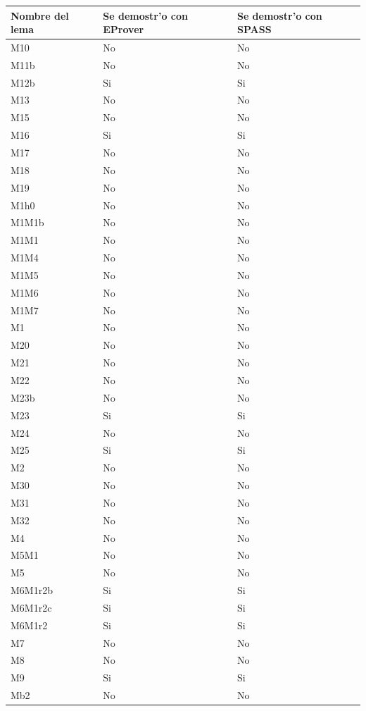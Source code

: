 \begin{tabular}{| l | l | l |}
\hline
  Nombre del lema & Se demostr'o con EProver & Se demostr'o con SPASS  \\\hline
  
M10 & No & No \\
M11b & No & No \\
M12b & Si & Si \\
M13 & No & No \\
M15 & No & No \\
M16 & Si & Si \\
M17 & No & No \\
M18 & No & No \\
M19 & No & No \\
M1h0 & No & No \\
M1M1b & No & No \\
M1M1 & No & No \\
M1M4 & No & No \\
M1M5 & No & No \\
M1M6 & No & No \\
M1M7 & No & No \\
M1 & No & No \\
M20 & No & No \\
M21 & No & No \\
M22 & No & No \\
M23b & No & No \\
M23 & Si & Si \\
M24 & No & No \\
M25 & Si & Si \\
M2 & No & No \\
M30 & No & No \\
M31 & No & No \\
M32 & No & No \\
M4 & No & No \\
M5M1 & No & No \\
M5 & No & No \\
M6M1r2b & Si & Si \\
M6M1r2c & Si & Si \\
M6M1r2 & Si & Si \\
M7 & No & No \\
M8 & No & No \\
M9 & Si & Si \\
Mb2 & No & No \\

\hline
\end{tabular}

\vspace{1em}


